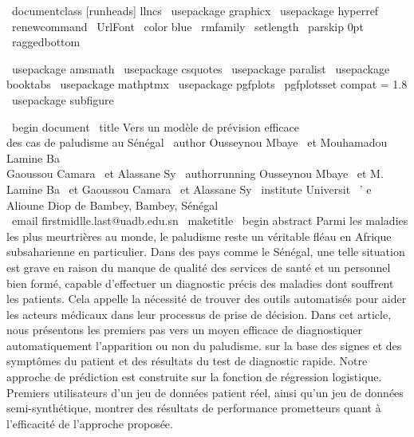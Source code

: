 %
\ documentclass [runheads] {llncs}
%
\ usepackage {graphicx}
\ usepackage {hyperref}
\ renewcommand \ UrlFont { \ color {blue} \ rmfamily }
\ setlength { \ parskip } {0pt}
\ raggedbottom

\ usepackage {amsmath}
\ usepackage {csquotes}
\ usepackage {paralist}
\ usepackage {booktabs}
\ usepackage {mathptmx}
\ usepackage {pgfplots}
\ pgfplotsset {compat = 1.8}
\ usepackage {subfigure}

\ begin {document}
%
\ title {Vers un modèle de prévision efficace \\ des cas de paludisme au Sénégal}
%
%
\ author {Ousseynou Mbaye \ et Mouhamadou Lamine Ba \\ Gaoussou Camara \ et Alassane Sy}
%
\ authorrunning {Ousseynou Mbaye \ et M. Lamine Ba \ et Gaoussou Camara \ et Alassane Sy}
%
\ institute {Universit \ ' e Alioune Diop de Bambey, Bambey, Sénégal \\
\ email {firstmidlle.last@uadb.edu.sn}
}
%
\ maketitle               %
%
\ begin {abstract}
Parmi les maladies les plus meurtrières au monde, le paludisme reste un véritable fléau en Afrique subsaharienne 
en particulier. Dans des pays comme le Sénégal, une telle situation est grave en raison du manque de qualité
des services de santé et un personnel bien formé, capable d’effectuer un diagnostic précis des maladies dont souffrent les patients. 
Cela appelle la nécessité de trouver des outils automatisés pour aider les acteurs médicaux dans leur processus de prise de décision.
Dans cet article, nous présentons les premiers pas vers un moyen efficace de diagnostiquer automatiquement l’apparition ou non du paludisme. 
sur la base des signes et des symptômes du patient et des résultats du test de diagnostic rapide. Notre approche de prédiction est construite
sur la fonction de régression logistique. Premiers utilisateurs d'un jeu de données patient réel, ainsi qu'un jeu de données semi-synthétique,
montrer des résultats de performance prometteurs quant à l'efficacité de l'approche proposée.
 

